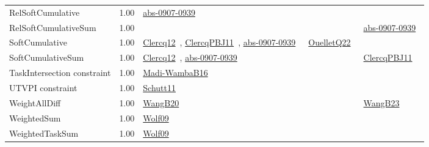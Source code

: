 {\begin{longtable}{p{3cm}r>{\raggedright\arraybackslash}p{6cm}>{\raggedright\arraybackslash}p{6cm}>{\raggedright\arraybackslash}p{8cm}}
\index{RelSoftCumulative}\index{Constraints!RelSoftCumulative}RelSoftCumulative &  1.00 & \href{../works/abs-0907-0939.pdf}{abs-0907-0939}~\cite{abs-0907-0939} &  & \\
\index{RelSoftCumulativeSum}\index{Constraints!RelSoftCumulativeSum}RelSoftCumulativeSum &  1.00 &  &  & \href{../works/abs-0907-0939.pdf}{abs-0907-0939}~\cite{abs-0907-0939}\\
\index{SoftCumulative}\index{Constraints!SoftCumulative}SoftCumulative &  1.00 & \href{../works/Clercq12.pdf}{Clercq12}~\cite{Clercq12}, \href{../works/ClercqPBJ11.pdf}{ClercqPBJ11}~\cite{ClercqPBJ11}, \href{../works/abs-0907-0939.pdf}{abs-0907-0939}~\cite{abs-0907-0939} & \href{../works/OuelletQ22.pdf}{OuelletQ22}~\cite{OuelletQ22} & \\
\index{SoftCumulativeSum}\index{Constraints!SoftCumulativeSum}SoftCumulativeSum &  1.00 & \href{../works/Clercq12.pdf}{Clercq12}~\cite{Clercq12}, \href{../works/abs-0907-0939.pdf}{abs-0907-0939}~\cite{abs-0907-0939} &  & \href{../works/ClercqPBJ11.pdf}{ClercqPBJ11}~\cite{ClercqPBJ11}\\
\index{TaskIntersection constraint}\index{Constraints!TaskIntersection constraint}TaskIntersection constraint &  1.00 & \href{../works/Madi-WambaB16.pdf}{Madi-WambaB16}~\cite{Madi-WambaB16} &  & \\
\index{UTVPI constraint}\index{Constraints!UTVPI constraint}UTVPI constraint &  1.00 & \href{../works/Schutt11.pdf}{Schutt11}~\cite{Schutt11} &  & \\
\index{WeightAllDiff}\index{Constraints!WeightAllDiff}WeightAllDiff &  1.00 & \href{../works/WangB20.pdf}{WangB20}~\cite{WangB20} &  & \href{../works/WangB23.pdf}{WangB23}~\cite{WangB23}\\
\index{WeightedSum}\index{Constraints!WeightedSum}WeightedSum &  1.00 & \href{../works/Wolf09.pdf}{Wolf09}~\cite{Wolf09} &  & \\
\index{WeightedTaskSum}\index{Constraints!WeightedTaskSum}WeightedTaskSum &  1.00 & \href{../works/Wolf09.pdf}{Wolf09}~\cite{Wolf09} &  & \\

\end{longtable}}
